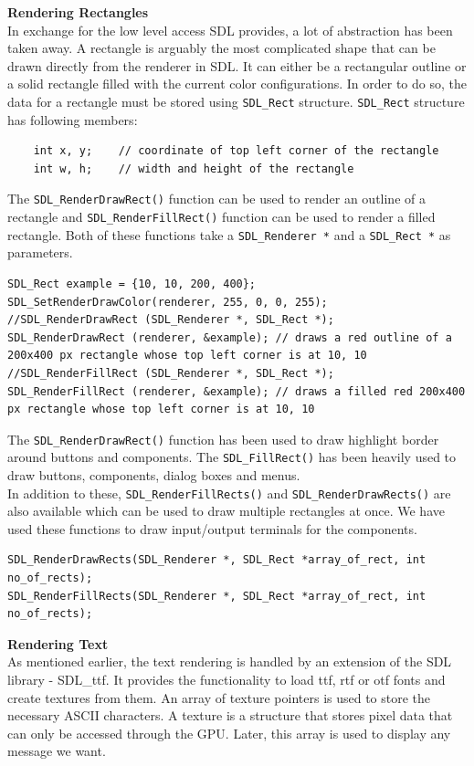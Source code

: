 \documentclass[report]{subfiles}
\begin{document}
    \textbf{Rendering Rectangles}\\
    In exchange for the low level access SDL provides, a lot of abstraction has been taken away. A rectangle is arguably the most complicated shape that can be drawn directly from the renderer in SDL. It can either be a rectangular outline or a solid rectangle filled with the current color configurations. In order to do so, the data for a rectangle must be stored using \texttt{SDL\_Rect} structure.
    \texttt{SDL\_Rect} structure has following members:
\begin{lstlisting}
    int x, y;    // coordinate of top left corner of the rectangle
    int w, h;    // width and height of the rectangle
\end{lstlisting}
The \texttt{SDL\_RenderDrawRect()} function can be used to render an outline of a rectangle and \texttt{SDL\_RenderFillRect()} function can be used to render a filled rectangle. Both of these functions take a \texttt{SDL\_Renderer *} and a \texttt{SDL\_Rect *} as parameters.
\begin{lstlisting}
SDL_Rect example = {10, 10, 200, 400};
SDL_SetRenderDrawColor(renderer, 255, 0, 0, 255);
//SDL_RenderDrawRect (SDL_Renderer *, SDL_Rect *);
SDL_RenderDrawRect (renderer, &example); // draws a red outline of a 200x400 px rectangle whose top left corner is at 10, 10
//SDL_RenderFillRect (SDL_Renderer *, SDL_Rect *);
SDL_RenderFillRect (renderer, &example); // draws a filled red 200x400 px rectangle whose top left corner is at 10, 10
\end{lstlisting}
The \texttt{SDL\_RenderDrawRect()} function has been used to draw highlight border around buttons and components. The \texttt{SDL\_FillRect()} has been heavily used to draw buttons, components, dialog boxes and menus.\\
In addition to these, \texttt{SDL\_RenderFillRects()} and \texttt{SDL\_RenderDrawRects()} are also available which can be used to draw multiple rectangles at once. We have used these functions to draw input/output terminals for the components.
\begin{lstlisting}	
SDL_RenderDrawRects(SDL_Renderer *, SDL_Rect *array_of_rect, int no_of_rects);
SDL_RenderFillRects(SDL_Renderer *, SDL_Rect *array_of_rect, int no_of_rects);
\end{lstlisting}
    \textbf{Rendering Text}\\
    As mentioned earlier, the text rendering is handled by an extension of the SDL library - SDL\_ttf. It provides the functionality to load ttf, rtf or otf fonts and create textures from them. An array of texture pointers is used to store the necessary ASCII characters. A texture is a structure that stores pixel data that can only be accessed through the GPU. Later, this array is used to display any message we want.
\end{document}
